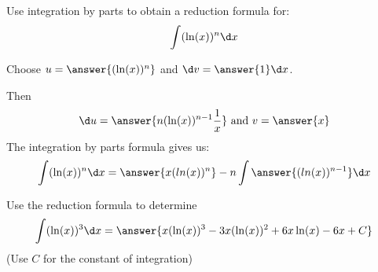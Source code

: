 \documentclass{ximera}
\author{Jason Miller}
\begin{document}
\begin{exercise}

Use integration by parts to obtain a reduction formula for:
\[
\int (\ln(x))^{n} \d x
\]


Choose $u=\answer{( \ln(x) )^{n} }$ and $\d v=\answer{1} \d x$.

Then
\[ \d u=\answer{n ( \ln(x) )^{n-1}\frac{1}{x}} \text{  and  } v=\answer{x}
\]
The integration by parts formula gives us:
\[
\int ( \ln(x) )^{n} \d x=\answer{x (ln(x))^{n}} - n \int \answer{(ln(x))^{n-1}} \d x
\]

Use the reduction formula to determine 
\[
\int ( \ln(x))^{3} \d x=\answer{x(\ln(x))^{3} -3x (\ln(x))^{2} + 6x \ln(x) -6x +C }
\]
(Use $C$ for the constant of integration)

\end{exercise}
\end{document}
